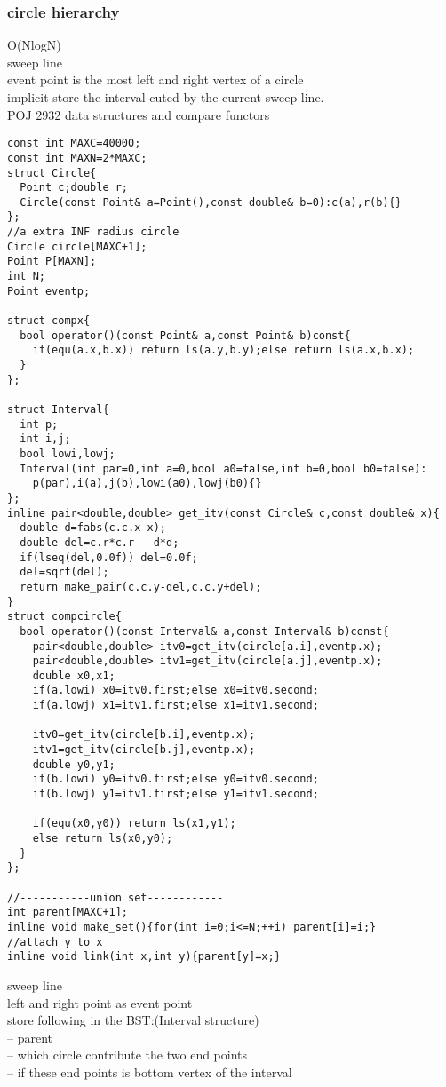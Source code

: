 \documentclass[a4paper]{article}
\begin{document}
\subsubsection{circle hierarchy}
O(NlogN) \\
sweep line \\ 
event point is the most left and right vertex of a circle  \\
implicit store the interval cuted by the current sweep line. \\
POJ 2932 
data structures and compare functors \\
\begin{lstlisting}
const int MAXC=40000;
const int MAXN=2*MAXC;
struct Circle{
  Point c;double r;
  Circle(const Point& a=Point(),const double& b=0):c(a),r(b){}
};
//a extra INF radius circle
Circle circle[MAXC+1];
Point P[MAXN];
int N;
Point eventp;

struct compx{
  bool operator()(const Point& a,const Point& b)const{
    if(equ(a.x,b.x)) return ls(a.y,b.y);else return ls(a.x,b.x);
  }
};

struct Interval{
  int p;
  int i,j;
  bool lowi,lowj;
  Interval(int par=0,int a=0,bool a0=false,int b=0,bool b0=false):
    p(par),i(a),j(b),lowi(a0),lowj(b0){}
};
inline pair<double,double> get_itv(const Circle& c,const double& x){
  double d=fabs(c.c.x-x);
  double del=c.r*c.r - d*d;
  if(lseq(del,0.0f)) del=0.0f;
  del=sqrt(del);
  return make_pair(c.c.y-del,c.c.y+del);
}
struct compcircle{
  bool operator()(const Interval& a,const Interval& b)const{
    pair<double,double> itv0=get_itv(circle[a.i],eventp.x);
    pair<double,double> itv1=get_itv(circle[a.j],eventp.x);
    double x0,x1;
    if(a.lowi) x0=itv0.first;else x0=itv0.second;
    if(a.lowj) x1=itv1.first;else x1=itv1.second;

    itv0=get_itv(circle[b.i],eventp.x);
    itv1=get_itv(circle[b.j],eventp.x);
    double y0,y1;
    if(b.lowi) y0=itv0.first;else y0=itv0.second;
    if(b.lowj) y1=itv1.first;else y1=itv1.second;

    if(equ(x0,y0)) return ls(x1,y1);
    else return ls(x0,y0);
  }
};

//-----------union set------------
int parent[MAXC+1];
inline void make_set(){for(int i=0;i<=N;++i) parent[i]=i;}
//attach y to x
inline void link(int x,int y){parent[y]=x;}
\end{lstlisting}
sweep line \\
left and right point as event point \\
store following in the BST:(Interval structure)  \\
 -- parent \\
 -- which circle contribute the two end points \\
 -- if these end points is bottom vertex of the interval
\end{document}
